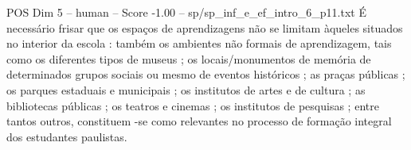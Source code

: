 \begin{textsample}{POS Dim 5 – human – Score -1.00 – sp/sp\_inf\_e\_ef\_intro\_6\_p11.txt}  \label{ex:f5_pos_013}
É necessário frisar que os espaços de aprendizagens não se limitam àqueles situados no interior da escola : também os ambientes não formais de aprendizagem, tais como os diferentes tipos de museus ; os locais/monumentos de memória de determinados grupos sociais ou mesmo de eventos históricos ; as praças públicas ; os parques estaduais e municipais ; os institutos de artes e de cultura ; as bibliotecas públicas ; os teatros e cinemas ; os institutos de pesquisas ; entre tantos outros, constituem -se como relevantes no processo de formação integral dos estudantes paulistas.

\end{textsample}
